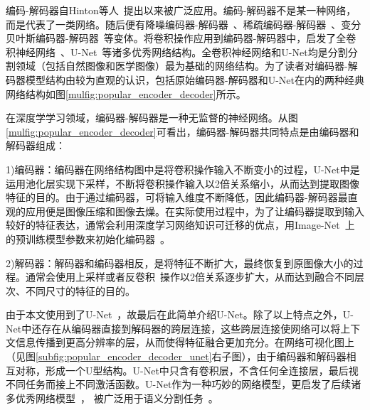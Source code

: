 编码-解码器自Hinton等人~\cite{hinton2006reducing}提出以来被广泛应用。编码-解码器不是某一种网络，而是代表了一类网络。随后便有降噪编码器-解码器~\cite{vincent2008extracting}、稀疏编码器-解码器~\cite{coates2011analysis}、变分贝叶斯编码器-解码器~\cite{kingma2013auto}等变体。将卷积操作应用到编码器-解码器中，启发了全卷积神经网络~\cite{long2015fully}、U-Net~\cite{ronneberger2015u}等诸多优秀网络结构。全卷积神经网络和U-Net均是分割分割领域（包括自然图像和医学图像）最为基础的网络结构。为了读者对编码器-解码器模型结构由较为直观的认识，包括原始编码器-解码器和U-Net在内的两种经典网络结构如图\ref{mulfig:popular_encoder_decoder}所示。

在深度学学习领域，编码器-解码器是一种无监督的神经网络。从图\ref{mulfig:popular_encoder_decoder}可看出，编码器-解码器共同特点是由编码器和解码器组成：

1)编码器：编码器在网络结构图中是将卷积操作输入不断变小的过程，U-Net中是运用池化层实现下采样，不断将卷积操作输入以2倍关系缩小，从而达到提取图像特征的目的。由于通过编码器，可将输入维度不断降低，因此编码器-解码器最直观的应用便是图像压缩和图像去燥。在实际使用过程中，为了让编码器提取到输入较好的特征表达，通常会利用深度学习网络知识可迁移的优点，用Image-Net~\cite{deng2009imagenet}上的预训练模型参数来初始化编码器~\cite{iglovikov2018ternausnet}。

2)解码器：解码器和编码器相反，是将特征不断扩大，最终恢复到原图像大小的过程。通常会使用上采样或者反卷积~\cite{zeiler2010deconvolutional}操作以2倍关系逐步扩大，从而达到融合不同层次、不同尺寸的特征的目的。

由于本文使用到了U-Net~\cite{ronneberger2015u}，故最后在此简单介绍U-Net。除了以上特点之外，U-Net中还存在从编码器直接到解码器的跨层连接，这些跨层连接使网络可以将上下文信息传播到更高分辨率的层，从而使得特征融合更加充分。在网络可视化图上（见图\ref{subfig:popular_encoder_decoder_unet}右子图），由于编码器和解码器相互对称，形成一个U型结构。U-Net中只含有卷积层，不含任何全连接层，最后视不同任务而接上不同激活函数。U-Net作为一种巧妙的网络模型，更启发了后续诸多优秀网络模型~\cite{zhou2018unet++, oktay2018attention, alom2019recurrent}，
被广泛用于语义分割任务~\cite{cciccek20163d,dong2017automatic,li2018h}。

